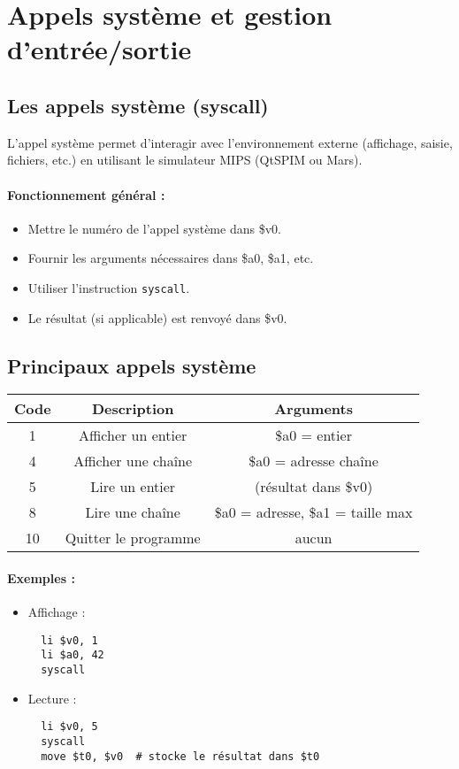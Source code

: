 \documentclass[12pt,a4paper]{article}
\begin{document}
\newpage

\section{Appels système et gestion d’entrée/sortie}

\subsection{Les appels système (syscall)}
L'appel système permet d'interagir avec l'environnement externe (affichage, saisie, fichiers, etc.) en utilisant le simulateur MIPS (QtSPIM ou Mars).

\paragraph{Fonctionnement général :}
\begin{itemize}
  \item Mettre le numéro de l'appel système dans \$v0.
  \item Fournir les arguments nécessaires dans \$a0, \$a1, etc.
  \item Utiliser l’instruction \texttt{syscall}.
  \item Le résultat (si applicable) est renvoyé dans \$v0.
\end{itemize}

\subsection{Principaux appels système}
\begin{center}
\begin{tabular}{|c|c|c|}
\hline
\textbf{Code} & \textbf{Description} & \textbf{Arguments} \\
\hline
1 & Afficher un entier & \$a0 = entier \\
4 & Afficher une chaîne & \$a0 = adresse chaîne \\
5 & Lire un entier & (résultat dans \$v0) \\
8 & Lire une chaîne & \$a0 = adresse, \$a1 = taille max \\
10 & Quitter le programme & aucun \\
\hline
\end{tabular}
\end{center}

\paragraph{Exemples :}
\begin{itemize}
  \item Affichage :
  \begin{verbatim}
  li $v0, 1
  li $a0, 42
  syscall
  \end{verbatim}
  \item Lecture :
  \begin{verbatim}
  li $v0, 5
  syscall
  move $t0, $v0  # stocke le résultat dans $t0
  \end{verbatim}
\end{itemize}
\end{document}
